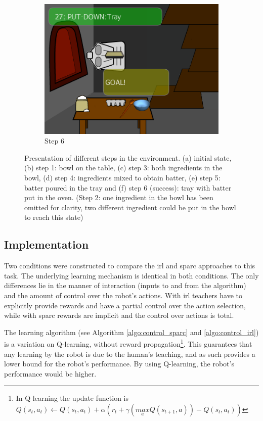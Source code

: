 \begin{figure}[ht]
\begin{subfigure}[b]{0.325\textwidth}
		\includegraphics[width=\textwidth]{step6.png}
		\caption{Step 6}
		\label{fig:control_goal}
	\end{subfigure}
	
	\caption{Presentation of different steps in the environment. (a) initial state, (b) step 1: bowl on the table, (c) step 3: both ingredients in the bowl, (d) step 4: ingredients mixed to obtain batter, (e) step 5: batter poured in the tray and (f) step 6 (success): tray with batter put in the oven. (Step 2: one ingredient in the bowl has been omitted for clarity, two different ingredient could be put in the bowl to reach this state)}
	\label{fig:control_states}
\end{figure}

\subsection{Implementation}

Two conditions were constructed to compare the \gls{irl} and \gls{sparc} approaches to this task. The underlying learning mechanism is identical in both conditions. The only differences lie in the manner of interaction (inputs to and from the algorithm) and the amount of control over the robot's actions. With \gls{irl} teachers have to explicitly provide rewards and have a partial control over the action selection, while with \gls{sparc} rewards are implicit and the control over actions is total. 

The learning algorithm (see Algorithm \ref{algo:control_sparc} and \ref{algo:control_irl}) is a variation on Q-learning, without reward propagation\footnote{In Q learning the update function is $Q(s_{t},a_{t}) \leftarrow Q(s_{t},a_{t}) + \alpha (r_{t}+\gamma (\underset{a}{max} Q(s_{t+1},a))-Q(s_{t},a_{t}))$}. This guarantees that any learning by the robot is due to the human's teaching, and as such provides a lower bound for the robot's performance. By using Q-learning, the robot's performance would be higher.

